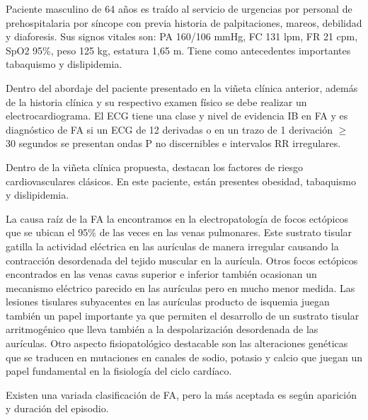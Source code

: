 \documentclass[a4paper]{article}
\let\cite=\supercite
\begin{document}
\begin{multicols}{3}
\begin{boxClinica}

Paciente masculino de 64 años es traído al servicio de urgencias por personal
de prehospitalaria por síncope con previa historia de palpitaciones, mareos,
debilidad y diaforesis. Sus signos vitales son: PA 160/106 mmHg, FC 131 lpm,
FR 21 cpm, SpO2 95\%, peso 125 kg, estatura 1,65 m. Tiene como antecedentes
importantes tabaquismo y dislipidemia.

\end{boxClinica}

Dentro del abordaje del paciente presentado en la viñeta clínica anterior,
además de la historia clínica y su respectivo examen físico se debe realizar un
electrocardiograma. El ECG tiene una clase y nivel de evidencia IB en FA y es
diagnóstico de FA si un ECG de 12 derivadas o en un trazo de 1 derivación
$\geq$ 30 segundos se presentan ondas P no discernibles e intervalos RR
irregulares\cite{guiaesc_2021}.

Dentro de la viñeta clínica propuesta, destacan los factores de riesgo
cardiovasculares clásicos. En este paciente, están presentes obesidad,
tabaquismo y dislipidemia.

La causa raíz de la FA la encontramos en la electropatología de focos ectópicos
que se ubican el 95\% de las veces en las venas pulmonares. Este sustrato
tisular gatilla la actividad eléctrica en las aurículas de manera irregular
causando la contracción desordenada del tejido muscular en la aurícula. Otros
focos ectópicos encontrados en las venas cavas superior e inferior también
ocasionan un mecanismo eléctrico parecido en las aurículas pero en mucho menor
medida. Las lesiones tisulares subyacentes en las aurículas producto de
isquemia juegan también un papel importante ya que permiten el desarrollo de un
sustrato tisular arritmogénico que lleva también a la despolarización
desordenada de las aurículas. Otro aspecto fisiopatológico destacable son las
alteraciones genéticas que se traducen en mutaciones en canales de sodio,
potasio y calcio que juegan un papel fundamental en la fisiología del ciclo
cardíaco\cite{brundel_atrial_2022}.

Existen una variada clasificación de FA, pero la más aceptada es según
aparición y duración del episodio.


\end{multicols}
\end{document}
